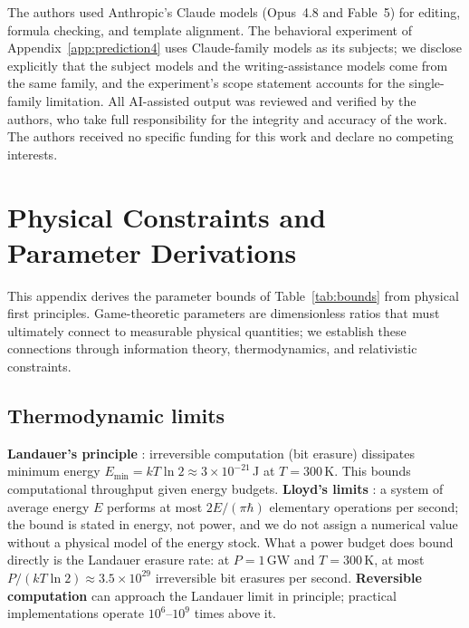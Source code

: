 \documentclass[manuscript,screen,review]{jair}
\begin{document}
\begin{acks}
The authors used Anthropic's Claude models (Opus~4.8 and Fable~5) for editing, formula checking, and template alignment. The behavioral experiment of Appendix~\ref{app:prediction4} uses Claude-family models as its subjects; we disclose explicitly that the subject models and the writing-assistance models come from the same family, and the experiment's scope statement accounts for the single-family limitation. All AI-assisted output was reviewed and verified by the authors, who take full responsibility for the integrity and accuracy of the work. The authors received no specific funding for this work and declare no competing interests.
\end{acks}

\printbibliography

\appendix

\section{Physical Constraints and Parameter Derivations}
\label{app:physical}

This appendix derives the parameter bounds of Table~\ref{tab:bounds} from physical first principles. Game-theoretic parameters are dimensionless ratios that must ultimately connect to measurable physical quantities; we establish these connections through information theory, thermodynamics, and relativistic constraints.

\subsection{Thermodynamic limits}
\textbf{Landauer's principle} \cite{landauer.1961}: irreversible computation (bit erasure) dissipates minimum energy $E_{\min} = kT\ln 2 \approx 3\times 10^{-21}$\,J at $T=300$\,K. This bounds computational throughput given energy budgets. \textbf{Lloyd's limits} \cite{lloyd.2000}: a system of average energy $E$ performs at most $2E/(\pi\hbar)$ elementary operations per second; the bound is stated in energy, not power, and we do not assign a numerical value without a physical model of the energy stock. What a power budget does bound directly is the Landauer erasure rate: at $P = 1$\,GW and $T = 300$\,K, at most $P/(kT\ln 2) \approx 3.5\times 10^{29}$ irreversible bit erasures per second. \textbf{Reversible computation} \cite{bennett.1982} can approach the Landauer limit in principle; practical implementations operate $10^6$--$10^9$ times above it.
\end{document}
